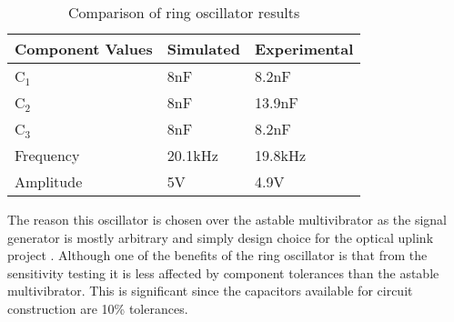 \begin{table}[H]
	\centering
	\caption{Comparison of ring oscillator results}
	\label{tab:simvexpring}
	\begin{tabular}{|l|l|l|}
		\hline
		Component Values & Simulated & Experimental \\ \hline
		C$_1$            & 8nF       & 8.2nF        \\ \hline
		C$_2$            & 8nF       & 13.9nF       \\ \hline
		C$_3$            & 8nF       & 8.2nF        \\ \hline
		Frequency        & 20.1kHz   & 19.8kHz      \\ \hline
		Amplitude        & 5V        & 4.9V         \\ \hline
	\end{tabular}
	\end{table}
The reason this oscillator is chosen over the astable multivibrator as the signal generator is mostly arbitrary and simply design choice for the optical uplink project \cite{b4}. Although one of the benefits of the ring oscillator is that from the sensitivity testing it is less affected by component tolerances than the astable multivibrator. This is significant since the capacitors available for circuit construction are 10\% tolerances.


